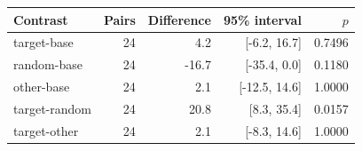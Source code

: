 \begin{tabular}{lrrrr}
\toprule
Contrast & Pairs & Difference & 95\% interval & $p$ \\
\midrule
target-base & 24 & 4.2 & [-6.2, 16.7] & 0.7496 \\
random-base & 24 & -16.7 & [-35.4, 0.0] & 0.1180 \\
other-base & 24 & 2.1 & [-12.5, 14.6] & 1.0000 \\
target-random & 24 & 20.8 & [8.3, 35.4] & 0.0157 \\
target-other & 24 & 2.1 & [-8.3, 14.6] & 1.0000 \\
\bottomrule
\end{tabular}